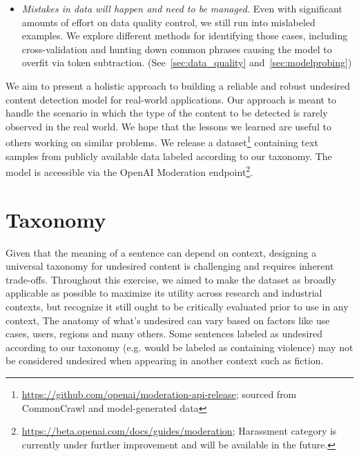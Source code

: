 \documentclass[letterpaper]{article} %
\begin{document}
\begin{itemize}
    \item \textit{Mistakes in data will happen and need to be managed.} Even with significant amounts of effort on data quality control, we still run into mislabeled examples. We explore different methods for identifying those cases, including cross-validation and hunting down common phrases causing the model to overfit via token subtraction. (See~\cref{sec:data_quality} and~\cref{sec:modelprobing})
\end{itemize}


We aim to present a holistic approach to building a reliable and robust undesired content detection model for real-world applications. Our approach is meant to handle the scenario in which the type of the content to be detected is rarely observed in the real world. We hope that the lessons we learned are useful to others working on similar problems. We release a dataset\footnote{
\url{https://github.com/openai/moderation-api-release}; sourced from CommonCrawl and model-generated data
} containing text samples from publicly available data labeled according to our taxonomy. The model is accessible via the 
OpenAI Moderation 
endpoint\footnote{
\url{https://beta.openai.com/docs/guides/moderation}; Harassment category is currently under further improvement and will be available in the future.
}.



\section{Taxonomy}
\label{sec:taxonomy}

Given that the meaning of a sentence can depend on context, designing a universal taxonomy for undesired content is challenging and requires inherent trade-offs. 
Throughout this exercise, we aimed to make the dataset as broadly applicable as possible to maximize its utility across research and industrial contexts, but recognize it still ought to be critically evaluated prior to use in any context,
The anatomy of what's undesired can vary based on factors like use cases, users, regions and many others. Some sentences labeled as undesired according to our taxonomy (e.g.  would be labeled as containing violence) may not be considered undesired when appearing in another context such as fiction.
\end{document}
